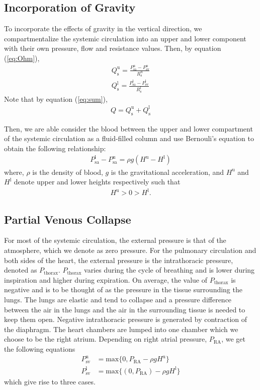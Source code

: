 \documentclass[12pt]{article}
\begin{document}
\subsection{Incorporation of Gravity}
To incorporate the effects of gravity in the vertical direction, we compartmentalize the systemic circulation into an upper and lower component with their own pressure, flow and resistance values. Then, by equation (\ref{eq:Ohm}), 
\begin{align}
    Q^\text{u}_\text{s} = \frac{P^\text{u}_\text{sa} - P^{\text{u}}_\text{sv}}{R^\text{u}_\text{s}} \label{eq:sysflowupper}\\
    Q^\text{l}_\text{s} = \frac{P^\text{l}_\text{sa} - P^{\text{l}}_\text{sv}}{R^\text{l}_\text{s}} \label{eq:sysflowlower}
\end{align}
Note that by equation (\ref{eq:sum}), 
\begin{align}
    Q = Q^\text{u}_\text{s} + Q^\text{l}_\text{s} 
\end{align}

Then, we are able consider the blood between the upper and lower compartment of the systemic circulation as a fluid-filled column and use Bernouli's equation to obtain the following relationship: 
\begin{align}
    P^\text{l}_{\text{sa}} - P^\text{u}_{\text{sa}} = \rho g(H^\text{u} - H^\text{l}) \label{eq:Pressure_diff_height}
\end{align}
where, $\rho$ is the density of blood, $g$ is the gravitational acceleration, and $H^\text{u}$ and $H^\text{l}$ denote upper and lower heights respectively such that 
\begin{align}
    H^\text{u}> 0 > H^\text{l}.
\end{align}
\subsection{Partial Venous Collapse}
For most of the systemic circulation, the external pressure is that of the atmosphere, which we denote as zero pressure. For the pulmonary circulation and both sides of the heart, the external pressure is the intrathoracic pressure, denoted as $P_\text{thorax}$. $P_\text{thorax}$ varies during the cycle of breathing and is lower during inspiration and higher during expiration. On average, the value of $P_\text{thorax}$ is negative and is to be thought of as the pressure in the tissue surrounding the lungs. The lungs are elastic and tend to collapse and a pressure difference between the air in the lungs and the air in the surrounding tissue is needed to keep them open. Negative intrathoracic pressure is generated by contraction of the diaphragm. The heart chambers are lumped into one chamber which we choose to be the right atrium. Depending on right atrial pressure, $P_\text{RA}$, we get the following equations
\begin{align}
    P_{\text{sv}}^\text{u} &= \text{max}\{0,P_{\text{RA}}-\rho g H^\text{u}\} \label{eq:cond_PsvU} \\
    P_{\text{sv}}^\text{l} &= \text{max}\{(0,P_{\text{RA}})-\rho g H^\text{l}\}\label{eq:cond_PsvL}
\end{align}
which give rise to three cases. 
\end{document}
